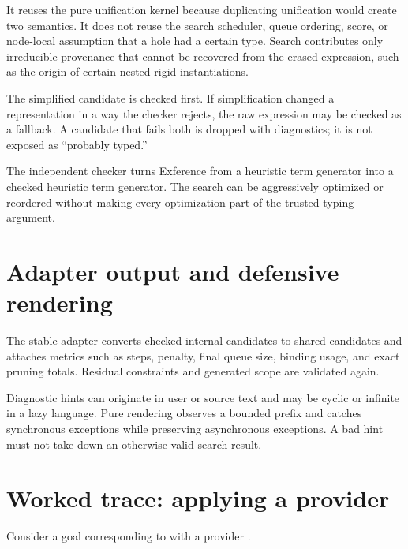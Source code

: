 \documentclass[10pt,letterpaper,oneside]{report}
\newcommand{\code}[1]{\texttt{\detokenize{#1}}}
\begin{document}
It reuses the pure unification kernel because duplicating unification would create two semantics. It does not reuse the search scheduler, queue ordering, score, or node-local assumption that a hole had a certain type. Search contributes only irreducible provenance that cannot be recovered from the erased expression, such as the origin of certain nested rigid instantiations.

The simplified candidate is checked first. If simplification changed a representation in a way the checker rejects, the raw expression may be checked as a fallback. A candidate that fails both is dropped with diagnostics; it is not exposed as ``probably typed.''

\begin{designbox}
The independent checker turns Exference from a heuristic term generator into a checked heuristic term generator. The search can be aggressively optimized or reordered without making every optimization part of the trusted typing argument.
\end{designbox}

\section{Adapter output and defensive rendering}

The stable adapter converts checked internal candidates to shared candidates and attaches metrics such as steps, penalty, final queue size, binding usage, and exact pruning totals. Residual constraints and generated scope are validated again.

Diagnostic hints can originate in user or source text and may be cyclic or infinite in a lazy language. Pure rendering observes a bounded prefix and catches synchronous exceptions while preserving asynchronous exceptions. A bad hint must not take down an otherwise valid search result.

\section{Worked trace: applying a provider}

Consider a goal corresponding to \code{(a -> b) -> F a -> F b} with a provider \code{mapF : forall x y. (x -> y) -> F x -> F y}.
\end{document}
